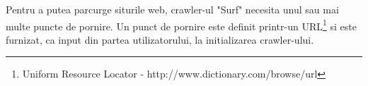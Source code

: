 \newcommand{\urlDescription}{Uniform Resource Locator - http://www.dictionary.com/browse/url}

Pentru a putea parcurge siturile web, crawler-ul "Surf" necesita unul sau mai multe puncte de pornire. Un punct de pornire este definit printr-un URL\footnote{\urlDescription} si este furnizat, ca input din partea utilizatorului, la initializarea crawler-ului.